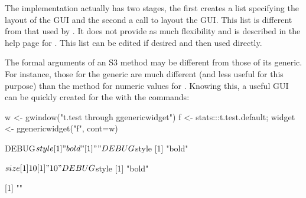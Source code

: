 The implementation actually has two stages, the first creates a list
specifying the layout of the GUI and the second a call to layout the
GUI. This list is different from that used by . It
does not provide as much flexibility and is described in the help page
for . This list can be edited if desired and then
used directly.

The formal arguments of an S3 method may be different from those of
its generic. For instance, those for the  generic are
much different (and less useful for this purpose) than the
 method for numeric values for . Knowing
this, a useful GUI can be quickly created for the  with
the commands:
\begin{Schunk}
\begin{Sinput}
 w <- gwindow("t.test through ggenericwidget")
 f <- stats:::t.test.default; 
 widget <- ggenericwidget("f", cont=w)
\end{Sinput}
\begin{Soutput}
DEBUG$style
[1] "bold"

[1] ""
DEBUG$style
[1] "bold"

$size
[1] 10

[1] " 10"
DEBUG$style
[1] "bold"

[1] ""
\end{Soutput}
\end{Schunk}










